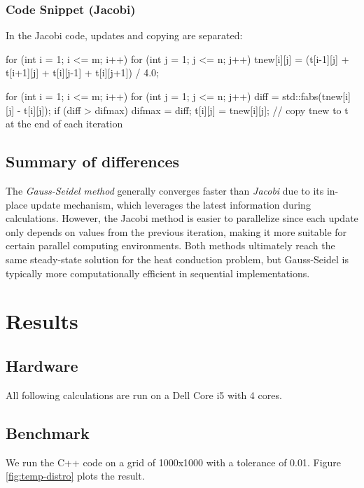 \documentclass[11pt,a4paper]{article}
\begin{document}
\subsubsection{Code Snippet (Jacobi)}

In the Jacobi code, updates and copying are separated:
\begin{VerbatimWrap}
for (int i = 1; i <= m; i++) {
    for (int j = 1; j <= n; j++) {
        tnew[i][j] = (t[i-1][j] + t[i+1][j] + t[i][j-1] + t[i][j+1]) / 4.0;
    }
}

for (int i = 1; i <= m; i++) {
    for (int j = 1; j <= n; j++) {
        diff = std::fabs(tnew[i][j] - t[i][j]);
        if (diff > difmax) {
            difmax = diff;
        }
        t[i][j] = tnew[i][j]; // copy tnew to t at the end of each iteration
    }
}
\end{VerbatimWrap}

\subsection{Summary of differences}

The \emph{Gauss-Seidel method} generally converges faster than
\emph{Jacobi} due to its in-place update mechanism, 
which leverages the latest information during calculations. 
However, the Jacobi method is easier to parallelize since each update only depends on values from
the previous iteration, 
making it more suitable for certain parallel
computing environments. 
Both methods ultimately reach the same
steady-state solution for the heat conduction problem, but Gauss-Seidel
is typically more computationally efficient in sequential
implementations.

\section{Results}

\subsection{Hardware}

All following calculations are run on a Dell Core i5 with 4 cores.

\subsection{Benchmark}

We run the C++ code on a grid of 1000x1000 with a tolerance of 0.01.
Figure \ref{fig:temp-distro} plots the result.
\end{document}
